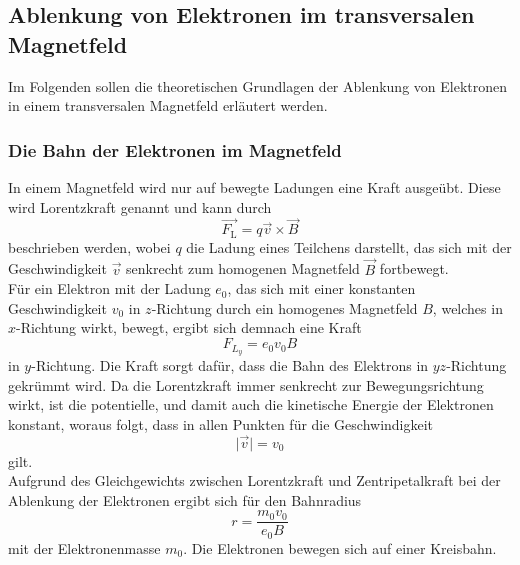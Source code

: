 \subsection{Ablenkung von Elektronen im transversalen Magnetfeld}
\label{sec:ablenkung_bfeld}

    Im Folgenden sollen die theoretischen Grundlagen der Ablenkung von Elektronen in einem transversalen Magnetfeld erläutert werden.

\subsubsection{Die Bahn der Elektronen im Magnetfeld}

    In einem Magnetfeld wird nur auf bewegte Ladungen eine Kraft ausgeübt.
    Diese wird Lorentzkraft genannt und kann durch
    \begin{equation*}
        \vec{F_\text{L}} = q \vec{v} \times \vec{B}
    \end{equation*}
    beschrieben werden,
    wobei $q$ die Ladung eines Teilchens darstellt,
    das sich mit der Geschwindigkeit $\vec{v}$ senkrecht zum homogenen Magnetfeld $\vec{B}$ fortbewegt.\\
    Für ein Elektron mit der Ladung $e_0$,
    das sich mit einer konstanten Geschwindigkeit $v_0$ in $z$-Richtung durch ein homogenes Magnetfeld $B$,
    welches in $x$-Richtung wirkt,
    bewegt,
    ergibt sich demnach eine Kraft
    \begin{equation*}
        F_{L_y} = e_0 v_0 B
    \end{equation*}
    in $y$-Richtung.
    Die Kraft sorgt dafür,
    dass die Bahn des Elektrons in $yz$-Richtung gekrümmt wird.
    Da die Lorentzkraft immer senkrecht zur Bewegungsrichtung wirkt,
    ist die potentielle,
    und damit auch die kinetische Energie der Elektronen konstant,
    woraus folgt,
    dass in allen Punkten für die Geschwindigkeit
    \begin{equation*}
        \lvert \vec{v} \rvert = v_0
    \end{equation*}
    gilt.\\
    Aufgrund des Gleichgewichts zwischen Lorentzkraft und Zentripetalkraft bei der Ablenkung der Elektronen ergibt sich für den Bahnradius
    \begin{equation}
        r = \frac{m_0 v_0}{e_0 B}
        \label{eqn:bahnradius}
    \end{equation}
    mit der Elektronenmasse $m_0$.
    Die Elektronen bewegen sich auf einer Kreisbahn.\\
